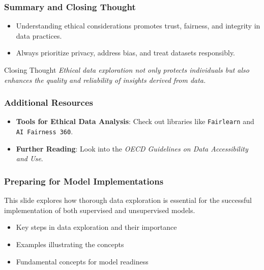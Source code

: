 \documentclass[aspectratio=169]{beamer}
\begin{document}
\begin{frame}[fragile]
    \frametitle{Summary and Closing Thought}
    \begin{itemize}
        \item Understanding ethical considerations promotes trust, fairness, and integrity in data practices.
        \item Always prioritize privacy, address bias, and treat datasets responsibly.
    \end{itemize}
    \begin{block}{Closing Thought}
        \textit{Ethical data exploration not only protects individuals but also enhances the quality and reliability of insights derived from data.}
    \end{block}
\end{frame}

\begin{frame}[fragile]
    \frametitle{Additional Resources}
    \begin{itemize}
        \item \textbf{Tools for Ethical Data Analysis}: Check out libraries like \texttt{Fairlearn} and \texttt{AI Fairness 360}.
        \item \textbf{Further Reading}: Look into the \textit{OECD Guidelines on Data Accessibility and Use}.
    \end{itemize}
\end{frame}

\begin{frame}[fragile]
    \frametitle{Preparing for Model Implementations}
    This slide explores how thorough data exploration is essential for the successful implementation of both supervised and unsupervised models. 
    \begin{itemize}
        \item Key steps in data exploration and their importance
        \item Examples illustrating the concepts
        \item Fundamental concepts for model readiness
    \end{itemize}
\end{frame}
\end{document}
